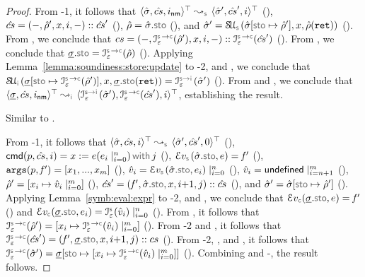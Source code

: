 \begin{proof}
\noindent {}
From \hyp{1}, it follows that $\abssemrule{\sstate, \scs, \retlab}{\sstate', \scs', i}{\top}{\top}{\symbolic}$ (), 
$\hat{cs} = (-, \hat\rho', x, i, -) :: \hat{cs}'$ (), $\sstore = \sstate.\stosel$ (), 
and $\sstate' = \stupdt{\symbolic}(\sstate[\stosel \mapsto \sstore'], \jvar, \sstore(\retvar))$ (). 
From , we conclude that $\cs = (-, \interpret{\symbconc}{\senv}(\sstore'), \jvar, i, -) :: \interpret{\symbconc}{\senv}(\scs')$ (). 
From , we conclude that $\istate.\stosel = \interpret{\symbconc}{\senv}(\sstore)$ (). 
Applying Lemma~\ref{lemma:soundiness:store:update} to \hyp{2},  and , we conclude that $\stupdt{\instrumented}(\istate[\stosel \mapsto \interpret{\symbconc}{\senv}(\sstore')], \jvar, \istate.\stosel(\retvar)) = \interpret{\symbinst}{\senv}(\sstate')$ (). 
From  and , we conclude that $\abssemrule{\istate, \scs, \retlab}{\interpret{\symbinst}{\senv}(\sstate'), \interpret{\symbconc}{\senv}(\scs'), i}{\top}{\top}{\instrumented}$, 
establishing the result. 
 \vspace{5pt}

\noindent {}
Similar to . 
 \vspace{5pt}


\noindent {}
From \hyp{1}, it follows that $\abssemrule{\sstate, \scs, i}{\sstate', \scs', 0}{\top}{\top}{\symbolic}$ (), 
$\ccmd[\prog][\scs]{i} =   \jsilcall{\jvar}{\jsilexpr}{\jsilexpr_i \mid_{i = 0}^{n}}{j}$ (), 
$\evalexpr{\symbolic}(\sstate.\stosel, \jsilexpr) =  \pid'$ (), 
$\mathtt{args}(p, \mathit{f}') = [ x_1, ..., x_{m} ]$ (), 
$\sexprv_i = \evalexpr{\symbolic}(\sstate.\stosel, \jsilexpr_i) \mid_{i = 0}^{n}$ (), 
$\hat{v}_i = {\sf undefined} \mid_{i = n+1}^{m}$ (), 
$\hat\rho' = [x_i \mapsto \hat{v}_i \mid_{i = 0}^{m}]$ (),  
$\scs' = (\pid', \sstate.\stosel, \jvar, i{+}1, j) :: \scs$ (), and 
$\sstate' = \sstate[\stosel \mapsto \sstore']$ (). 
Applying Lemma~\ref{symb:eval:expr} to \hyp{2},  and , we conclude that 
$\evalexpr{\concrete}(\istate.\stosel, \jsilexpr) =  \pid'$ () 
and 
$\evalexpr{\concrete}(\istate.\stosel, \jsilexpr_i) = \interpret{\symbolic}{\senv}(\sexprv_i) \mid_{i = 0}^{n}$ (). 
From , it follows that $\interpret{\symbconc}{\senv}(\sstore') = [\jvar_i \mapsto \interpret{\symbconc}{\senv}(\sexprv_i) \mid_{i = 0}^{m}]$ (). 
From \hyp{2} and , it follows that $\interpret{\symbconc}{\senv}(\scs') = (\pid', \istate.\stosel, \jvar, i{+}1, j) :: \cs$ ().
From \hyp{2}, , and , it follows that 
$\interpret{\symbconc}{\senv}(\sstate') = \istate[\stosel \mapsto  [\jvar_i \mapsto \interpret{\symbconc}{\senv}(\sexprv_i) \mid_{i = 0}^{m}]]$ (). 
Combining  and -, the result follows. 
\vspace{5pt}


\end{proof}
